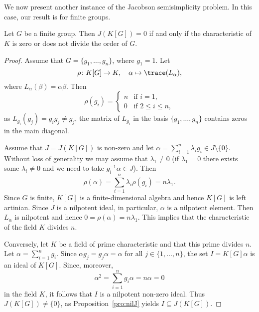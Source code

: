 \chapter{}


We now present another instance of the Jacobson semisimplicity problem.
In this case, our result is for finite groups. 

\begin{theorem}[Maschke]
	Let $G$ be a finite group. Then $J(K[G])=0$ if and only 
	if the characteristic of $K$ is zero 
	or does not divide the order of $G$. 
\end{theorem}

\begin{proof}
	Assume that $G=\{g_1,\dots,g_n\}$, where $g_1=1$. Let 
	\[
	\rho\colon K[G]\to K,
	\quad
	\alpha\mapsto\trace(L_{\alpha}),
	\]
	where 
	$L_{\alpha}(\beta)=\alpha\beta$. Then 
	\[
	\rho(g_i)=\begin{cases}
	    n & \text{if $i=1$,}\\
	    0 & \text{if $2\leq i\leq n$},
	\end{cases}
	\]
	as $L_{g_i}(g_j)=g_{i}g_j\ne g_j$, the matrix of 
	$L_{g_i}$ in the basis $\{g_1,\dots,g_n\}$ contains zeros in the main diagonal. 

	Assume that $J=J(K[G])$ is non-zero and let 
	$\alpha=\sum_{i=1}^n\lambda_ig_i\in J\setminus\{0\}$. Without loss of generality
	we may assume that $\lambda_1\ne 0$ (if $\lambda_1=0$ there exists some 
	$\lambda_i\ne 0$ and we need to take $g_i^{-1}\alpha\in J$). Then 
	\[
		\rho(\alpha)=\sum_{i=1}^n \lambda_i\rho(g_i)=n\lambda_1.
	\]
	Since $G$ is finite, $K[G]$ is a finite-dimensional algebra and hence 
	$K[G]$ is left artinian. Since $J$ is a nilpotent ideal, 
	in particular, $\alpha$ is a nilpotent element. Then 
	$L_{\alpha}$ is nilpotent and hence $0=\rho(\alpha)=n\lambda_1$. This implies that
	the characteristic of the field $K$ divides $n$. 

	Conversely, let $K$ be a field of prime characteristic and that this prime divides 
	$n$. Let $\alpha=\sum_{i=1}^ng_i$. Since $\alpha
	g_j=g_j\alpha=\alpha$ for all $j\in\{1,\dots,n\}$, the set 
	$I=K[G]\alpha$ is an ideal of $K[G]$. Since, moreover,   
	\[
		\alpha^2=\sum_{i=1}^n g_i\alpha=n\alpha=0
	\]
	in the field $K$, it follows that $I$ is a nilpotent non-zero ideal. Thus $J(K[G])\ne\{0\}$, 
	as Proposition~\ref{pro:nilJ} yields $I\subseteq J(K[G])$.
\end{proof}

